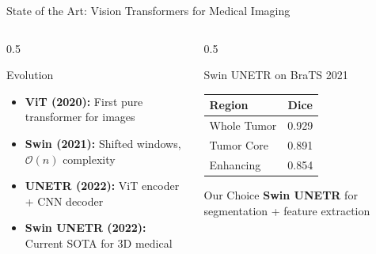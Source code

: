 \documentclass[aspectratio=169]{beamer}
\begin{document}
\begin{frame}{State of the Art: Vision Transformers for Medical Imaging}
    \begin{columns}
        \begin{column}{0.5\textwidth}
            \begin{block}{Evolution}
                \begin{itemize}
                    \item \textbf{ViT (2020):} First pure transformer for images
                    \item \textbf{Swin (2021):} Shifted windows, $\mathcal{O}(n)$ complexity
                    \item \textbf{UNETR (2022):} ViT encoder + CNN decoder
                    \item \textbf{Swin UNETR (2022):} Current SOTA for 3D medical
                \end{itemize}
            \end{block}
        \end{column}
        \begin{column}{0.5\textwidth}
            \begin{block}{Swin UNETR on BraTS 2021}
                \begin{center}
                    \begin{tabular}{lc}
                        \toprule
                        \textbf{Region} & \textbf{Dice} \\
                        \midrule
                        Whole Tumor & 0.929 \\
                        Tumor Core & 0.891 \\
                        Enhancing & 0.854 \\
                        \bottomrule
                    \end{tabular}
                \end{center}
            \end{block}
            
            \begin{alertblock}{Our Choice}
                \textbf{Swin UNETR} for segmentation + feature extraction
            \end{alertblock}
        \end{column}
    \end{columns}
\end{frame}
\end{document}
